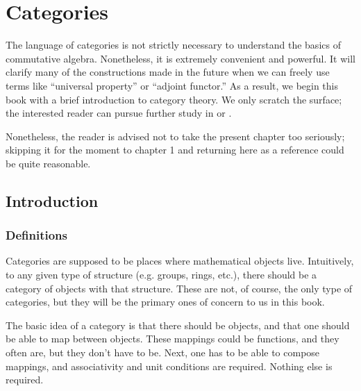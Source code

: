\setcounter{chapter}{-1}
\chapter{Categories}
\label{categorychapter}


The language of categories is not strictly necessary to understand the basics
of  commutative
algebra. Nonetheless, it is extremely convenient and powerful. It will clarify
many of the constructions made in the future when we can freely use terms like
``universal property'' or ``adjoint functor.'' As a result, we begin this book
with a brief introduction to category theory. We only scratch the surface; the
interested reader can pursue further study in \cite{Ma98} or \cite{KS05}.


Nonetheless, the reader is advised not to take the present chapter too
seriously; skipping it for the moment to chapter 1 and returning here as a
reference could be quite reasonable.

\section{Introduction}

\subsection{Definitions}

Categories are supposed to be places where mathematical objects live.
Intuitively, to any given type of structure (e.g. groups, rings, etc.),
there should be a
category of objects with that structure. These are not, of course, the only
type of categories, but they will be the primary ones of concern to us in this
book.


The basic idea of a category is that there should be objects, and that one
should be able to map between objects. These mappings could be functions, and
they often are, but they don't have to be. Next, one has to be able to compose
mappings, and associativity and unit conditions are required. Nothing else is required.

